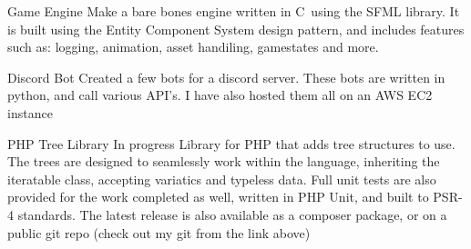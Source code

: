 \documentclass[9pt]{developercv}
\newcommand{\CC}{C\nolinebreak\hspace{-.05em}\raisebox{.4ex}{\tiny\bf +}\nolinebreak\hspace{-.10em}\raisebox{.4ex}{\tiny\bf +}}
\def\CC{{C\nolinebreak[4]\hspace{-.05em}\raisebox{.4ex}{\tiny\bf ++}}}
\begin{document}
\begin{minipage}[t]{0.6\textwidth}
		\begin{entrylist}
			\entry
				{\vphantom{1.0}}
				{Game Engine}
				{}
				{Make a bare bones engine written in \CC \ using the SFML library. It is built using the Entity Component System design pattern, and includes features such as: logging, animation, asset handiling, gamestates and more.}
		\end{entrylist}
		\begin{entrylist}
			\entry
				{\vphantom{1.0}}
				{Discord Bot}
				{}
				{Created a few bots for a discord server. These bots are written in python, and call various API's. I have also hosted them all on an AWS EC2 instance}
		\end{entrylist}
		\begin{entrylist}
			\entry
				{\vphantom{1.0}}
				{PHP Tree Library}
				{}
				{In progress Library for PHP that adds tree structures to use. The trees are designed to seamlessly work within the language, inheriting the iteratable class, accepting variatics and typeless data. Full unit tests are also provided for the work completed as well, written in PHP Unit, and built to PSR-4 standards. The latest release is also available as a composer package, or on a public git repo (check out my git from the link above)}
		\end{entrylist}
	\end{minipage}
\begin{minipage}[t]{0.1\textwidth}
\hphantom{0.1}
\end{minipage}
\end{document}
